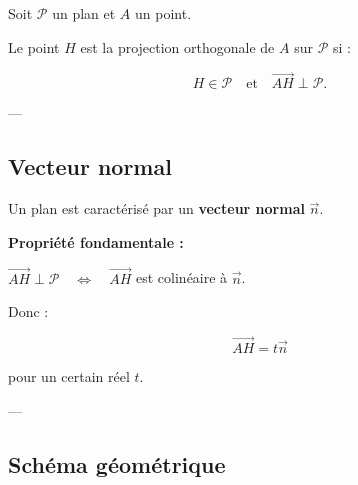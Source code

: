 \documentclass[11pt,a4paper]{article}
\begin{document}
Soit $\mathcal{P}$ un plan et $A$ un point.

\bigskip

Le point $H$ est la projection orthogonale de $A$ sur $\mathcal{P}$ si :

\[
H \in \mathcal{P}
\quad \text{et} \quad
\vec{AH} \perp \mathcal{P}.
\]

---

\subsection{Vecteur normal}

Un plan est caractérisé par un \textbf{vecteur normal} $\vec{n}$.

\bigskip

\textbf{Propriété fondamentale :}

\begin{center}
$\vec{AH} \perp \mathcal{P} \quad \Longleftrightarrow \quad \vec{AH}$ est colinéaire à $\vec{n}$.
\end{center}

\bigskip

Donc :

\[
\vec{AH} = t \vec{n}
\]

pour un certain réel $t$.

---

\subsection{Schéma géométrique}

\begin{center}
\end{center}
\end{document}

